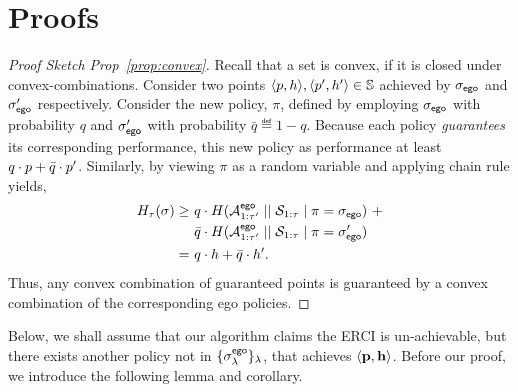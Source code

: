 \section{Proofs}\label{sec:proofs}
\begin{proof}[Proof Sketch Prop~\ref{prop:convex}]
  Recall that a set is convex, if it is closed under
  convex-combinations\footnotemark. Consider two points
  $\langle p, h \rangle, \langle p', h' \rangle \in
  \mathbb{S}$ achieved by ${\sigma_{\mathsf{ego}}}$ and ${\sigma'_{\mathsf{ego}}}$
  respectively. Consider the new policy, $\pi$, defined by employing
  ${\sigma_{\mathsf{ego}}}$ with probability $q$ and ${\sigma'_{\mathsf{ego}}}$ with
  probability $\bar{q} \eqdef 1 - q$.  Because each policy
  \emph{guarantees} its corresponding performance, this new policy as
  performance at least $q\cdot p + \bar{q}\cdot p'$.  Similarly,
  by viewing $\pi$ as a random variable and applying chain rule
  yields,
  \begin{equation}
    \begin{split}
      H_\tau(\sigma)
      \geq &~q \cdot H( {\mathcal{A}}^{\mathsf{ego}}_{1:\tau'} \mid\mid {\mathcal{S}}_{1:\tau} \mid \pi={\sigma_{\mathsf{ego}}})~+\\
      &~\bar{q}  \cdot H( {\mathcal{A}}^{\mathsf{ego}}_{1:\tau'} \mid\mid {\mathcal{S}}_{1:\tau} \mid \pi={\sigma'_{\mathsf{ego}}})\\
      =&~q\cdot h + \bar{q}\cdot h'.
    \end{split}
  \end{equation}
  Thus, any convex combination of guaranteed points is guaranteed by
  a convex combination of the corresponding ego policies.
\end{proof}


Below, we shall
assume that our algorithm claims the ERCI is un-achievable, but there
exists another policy not in $\{\sigma^{\mathsf{ego}}_\lambda\}_\lambda$, that
achieves $\langle \mathbf{p}, \mathbf{h} \rangle$. Before our proof,
we introduce the following lemma and corollary.


